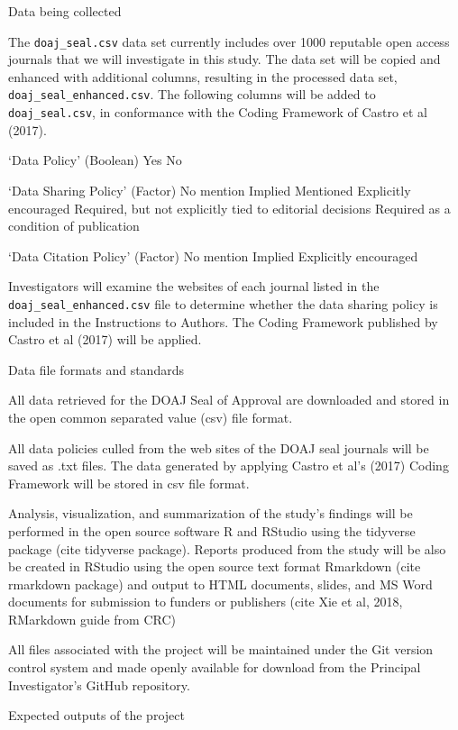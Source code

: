 \documentclass[ignorenonframetext,]{beamer}
\begin{document}
\begin{frame}[fragile]
\begin{block}{Data being collected}

The \texttt{doaj\_seal.csv} data set currently includes over 1000
reputable open access journals that we will investigate in this study.
The data set will be copied and enhanced with additional columns,
resulting in the processed data set, \texttt{doaj\_seal\_enhanced.csv}.
The following columns will be added to \texttt{doaj\_seal.csv}, in
conformance with the Coding Framework of Castro et al (2017).

`Data Policy' (Boolean) Yes No

`Data Sharing Policy' (Factor) No mention Implied Mentioned Explicitly
encouraged Required, but not explicitly tied to editorial decisions
Required as a condition of publication

`Data Citation Policy' (Factor) No mention Implied Explicitly encouraged

Investigators will examine the websites of each journal listed in the
\texttt{doaj\_seal\_enhanced.csv} file to determine whether the data
sharing policy is included in the Instructions to Authors. The Coding
Framework published by Castro et al (2017) will be applied.

Data file formats and standards

All data retrieved for the DOAJ Seal of Approval are downloaded and
stored in the open common separated value (csv) file format.

All data policies culled from the web sites of the DOAJ seal journals
will be saved as .txt files. The data generated by applying Castro et
al's (2017) Coding Framework will be stored in csv file format.

Analysis, visualization, and summarization of the study's findings will
be performed in the open source software R and RStudio using the
tidyverse package (cite tidyverse package). Reports produced from the
study will be also be created in RStudio using the open source text
format Rmarkdown (cite rmarkdown package) and output to HTML documents,
slides, and MS Word documents for submission to funders or publishers
(cite Xie et al, 2018, RMarkdown guide from CRC)

All files associated with the project will be maintained under the Git
version control system and made openly available for download from the
Principal Investigator's GitHub repository.

\begin{block}{Expected outputs of the project}


\end{block}
\end{block}
\end{frame}
\end{document}
